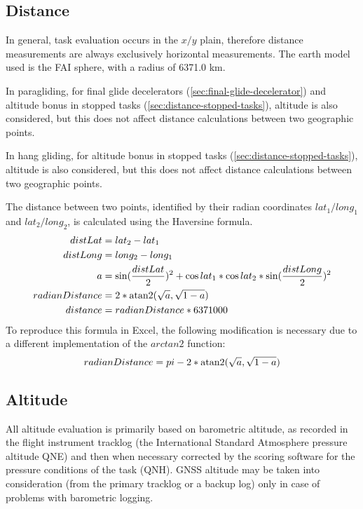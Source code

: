 \documentclass{article}
\begin{document}
\subsection{Distance}
\label{sec:distance}
In general, task evaluation occurs in the \(x/y\) plain, therefore distance
measurements are always exclusively horizontal measurements. The earth model used
is the FAI sphere, with a radius of 6371.0 km.

\begin{pg}
In paragliding, for final glide decelerators (\ref{sec:final-glide-decelerator})
and altitude bonus in stopped tasks (\ref{sec:distance-stopped-tasks}), altitude
is also considered, but this does not affect distance calculations between two
geographic points.
\end{pg}

\begin{hg}
In hang gliding, for altitude bonus in stopped tasks (\ref{sec:distance-stopped-tasks}),
altitude is also considered, but this does not affect distance calculations between
two geographic points.
\end{hg}

The distance between two points, identified by their radian coordinates
\(lat_1/long_1\) and \(lat_2/long_2\), is calculated using the Haversine formula.
\begin{align*}
    distLat &= lat_2 - lat_1 \\
    distLong &= long_2 - long_1 \\
    a &= \sin(\frac{distLat}{2})^2 + \cos lat_1 * \cos lat_2 * \sin(\frac{distLong}{2})^2 \\
    radianDistance &= 2 * \operatorname{atan2}(\sqrt a, \sqrt{1 - a}) \\
    distance &= radianDistance * 6371000 \\
\end{align*}
To reproduce this formula in Excel, the following modification is necessary due
to a different implementation of the \(arctan2\) function:
\[ radianDistance = pi - 2 * \operatorname{atan2}(\sqrt a, \sqrt{1 - a}) \]

\subsection{Altitude}
All altitude evaluation is primarily based on barometric altitude, as recorded
in the flight instrument tracklog (the International Standard Atmosphere
pressure altitude QNE) and then when necessary corrected by the scoring
software for the pressure conditions of the task (QNH). GNSS altitude may be
taken into consideration (from the primary tracklog or a backup log) only in
case of problems with barometric logging.
\end{document}
